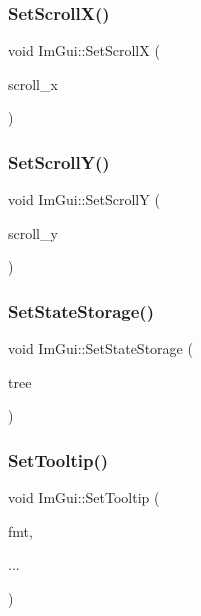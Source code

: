 \hypertarget{namespace_im_gui_a0796750de8c50555d895f63e79ac87f0}{}\label{namespace_im_gui_a0796750de8c50555d895f63e79ac87f0} 
\subsubsection{\texorpdfstring{Set\+Scroll\+X()}{SetScrollX()}}
{\footnotesize\ttfamily void Im\+Gui\+::\+Set\+ScrollX (\begin{DoxyParamCaption}\item[{float}]{scroll\+\_\+x }\end{DoxyParamCaption})}

\hypertarget{namespace_im_gui_a41833555962807384432e6fc94d46ec9}{}\label{namespace_im_gui_a41833555962807384432e6fc94d46ec9} 
\subsubsection{\texorpdfstring{Set\+Scroll\+Y()}{SetScrollY()}}
{\footnotesize\ttfamily void Im\+Gui\+::\+Set\+ScrollY (\begin{DoxyParamCaption}\item[{float}]{scroll\+\_\+y }\end{DoxyParamCaption})}

\hypertarget{namespace_im_gui_a635f4511603cc6284d8b21fb8d53090d}{}\label{namespace_im_gui_a635f4511603cc6284d8b21fb8d53090d} 
\subsubsection{\texorpdfstring{Set\+State\+Storage()}{SetStateStorage()}}
{\footnotesize\ttfamily void Im\+Gui\+::\+Set\+State\+Storage (\begin{DoxyParamCaption}\item[{\hyperlink{struct_im_gui_storage}{Im\+Gui\+Storage} $\ast$}]{tree }\end{DoxyParamCaption})}

\hypertarget{namespace_im_gui_a313073fa01b8a9791f241ef93091ce92}{}\label{namespace_im_gui_a313073fa01b8a9791f241ef93091ce92} 
\subsubsection{\texorpdfstring{Set\+Tooltip()}{SetTooltip()}}
{\footnotesize\ttfamily void Im\+Gui\+::\+Set\+Tooltip (\begin{DoxyParamCaption}\item[{const char $\ast$}]{fmt,  }\item[{}]{... }\end{DoxyParamCaption})}

